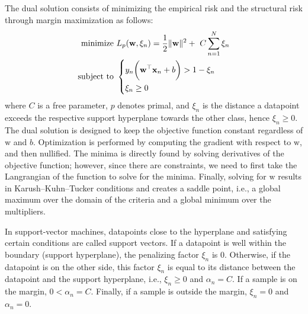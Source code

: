 \documentclass[11pt]{article}
\begin{document}
\begin{tcolorbox}[colback=CrispBlue!5!white,colframe=CrispBlue!75!black,title=6. Develop the analysis that leads to the dual solution of the SVM and its main results.]
The dual solution consists of minimizing the empirical risk and the structural risk through margin maximization as follows:
\begin{align}
	\text{minimize } &L_p(\bm{\mathrm{w}},\xi_n) = \frac{1}{2} \| \bm{\mathrm{w}} \|^2 +\ C \sum_{n=1}^{N} \xi_n\\
    \notag\text{subject to }&
        \begin{dcases}
            y_n\biggl(\bm{\mathrm{w}}^\top\bm{\mathrm{x}}_n + b\biggr) > 1 - \xi_n\\
            \xi_n \geq 0
        \end{dcases}
\end{align}
where \( C \) is a free parameter, \( p \) denotes primal, and \( \xi_n \) is  the distance a datapoint exceeds the respective support hyperplane towards the other class, hence \( \xi_n \geq 0\). The dual solution is designed to keep the objective function constant regardless of \( \bm{\mathrm{w}} \) and \( b \). Optimization is performed by computing the gradient with respect to \( \bm{\mathrm {w}} \), and then nullified. The minima is directly found by solving derivatives of the objective function; however, since there are constraints, we need to first take the Langrangian of the function to solve for the minima. Finally, solving for \( \bm{\mathrm {w}} \) results in Karush–Kuhn–Tucker conditions and creates a saddle point, i.e., a global maximum over the domain of the criteria and a global minimum over the multipliers.
\end{tcolorbox}

\begin{tcolorbox}[colback=CrispBlue!5!white,colframe=CrispBlue!75!black,title=7. Describe the properties of the Support Vectors.]
In support-vector machines, datapoints close to the hyperplane and satisfying certain conditions are called support vectors. If a datapoint is well within the boundary (support hyperplane), the penalizing factor \( \xi_n \) is 0. Otherwise, if the datapoint is on the other side, this factor \( \xi_n \) is equal to its distance between the datapoint and the support hyperplane, i.e., \( \xi_n \geq 0\) and \( \alpha_n = C \). If a sample is on the margin, \( 0 < \alpha_n = C \). Finally, if a sample is outside the margin, \( \xi_n = 0 \) and \( \alpha_n = 0 \).
\end{tcolorbox}
\end{document}
